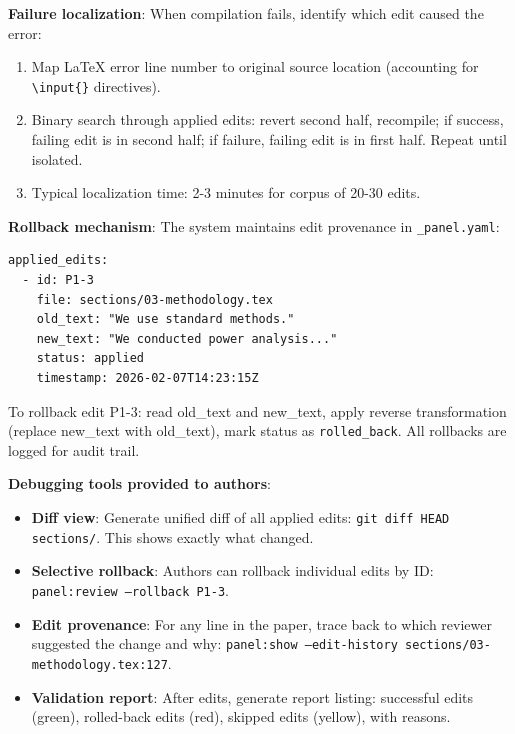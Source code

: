 \textbf{Failure localization}: When compilation fails, identify which edit caused the error:
\begin{enumerate}
\item Map LaTeX error line number to original source location (accounting for \texttt{\textbackslash{}input\{\}} directives).
\item Binary search through applied edits: revert second half, recompile; if success, failing edit is in second half; if failure, failing edit is in first half. Repeat until isolated.
\item Typical localization time: 2-3 minutes for corpus of 20-30 edits.
\end{enumerate}

\textbf{Rollback mechanism}: The system maintains edit provenance in \texttt{\_panel.yaml}:
\begin{verbatim}
applied_edits:
  - id: P1-3
    file: sections/03-methodology.tex
    old_text: "We use standard methods."
    new_text: "We conducted power analysis..."
    status: applied
    timestamp: 2026-02-07T14:23:15Z
\end{verbatim}

To rollback edit P1-3: read old\_text and new\_text, apply reverse transformation (replace new\_text with old\_text), mark status as \texttt{rolled\_back}. All rollbacks are logged for audit trail.

\textbf{Debugging tools provided to authors}:
\begin{itemize}
\item \textbf{Diff view}: Generate unified diff of all applied edits: \texttt{git diff HEAD sections/}. This shows exactly what changed.
\item \textbf{Selective rollback}: Authors can rollback individual edits by ID: \texttt{panel:review --rollback P1-3}.
\item \textbf{Edit provenance}: For any line in the paper, trace back to which reviewer suggested the change and why: \texttt{panel:show --edit-history sections/03-methodology.tex:127}.
\item \textbf{Validation report}: After edits, generate report listing: successful edits (green), rolled-back edits (red), skipped edits (yellow), with reasons.
\end{itemize}

